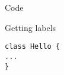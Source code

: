 \documentclass{beamer}
\begin{document}
\begin{frame}[fragile]{Code}

\begin{block}{Getting labels}
\begin{lstlisting}[firstnumber=1, label=glabels, xleftmargin=10pt] 
class Hello {
...
}
\end{lstlisting}
\end{block}
\end{frame}
\end{document}
